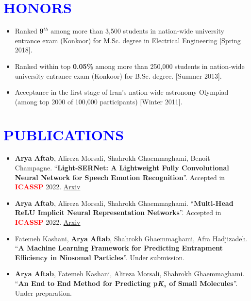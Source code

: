 \documentclass[letterpaper,11pt]{article}
\newcommand{\resumeSubHeadingListStart}{\begin{itemize}[leftmargin=0.0in, label={}]}
\begin{document}
\section{\Large{\textcolor{blue}{HONORS}}}
        \begin{itemize}[itemsep=-2pt, parsep=5pt]
            \item Ranked \textbf{9$^{th}$} among more than 3,500 students in nation-wide university entrance exam (Konkoor) for M.Sc. degree in Electrical Engineering [Spring 2018].
            \item Ranked within top \textbf{0.05\%} among more than 250,000 students in nation-wide university entrance exam (Konkoor) for B.Sc. degree. [Summer 2013].
            \item Acceptance in the first stage of Iran’s nation-wide astronomy Olympiad (among top 2000 of 100,000 participants) [Winter 2011].

        \end{itemize}
 
 
\section{\Large{\textcolor{blue}{PUBLICATIONS}}}
        \begin{itemize}[itemsep=0pt, parsep=5pt]
            \item \textbf{Arya Aftab}, Alireza Morsali, Shahrokh Ghaemmaghami, Benoit Champagne. “\textbf{Light-SERNet: A Lightweight Fully Convolutional Neural Network for Speech Emotion Recognition}”. Accepted in \textbf{\textcolor{red}{ICASSP}} 2022. \href{https://arxiv.org/pdf/2110.03435.pdf}{Arxiv {\raisebox{-0.1\height}\faExternalLink }}
            \item \textbf{Arya Aftab}, Alireza Morsali, Shahrokh Ghaemmaghami. “\textbf{Multi-Head ReLU Implicit Neural Representation Networks}”. Accepted in \textbf{\textcolor{red}{ICASSP}} 2022. \href{https://arxiv.org/pdf/2110.03448.pdf}{Arxiv {\raisebox{-0.1\height}\faExternalLink }}
            \item Fatemeh Kashani, \textbf{Arya Aftab}, Shahrokh Ghaemmaghami, Afra Hadjizadeh. “\textbf{A Machine Learning Framework for Predicting Entrapment Efficiency in Niosomal Particles}”. Under submission.
            \item \textbf{Arya Aftab}, Fatemeh Kashani, Alireza Morsali, Shahrokh Ghaemmaghami. “\textbf{An End to End Method for Predicting p\textit{K}$_{a}$ of Small Molecules}”. Under preparation.
        \end{itemize}
        \vspace{-10pt}
\end{document}
